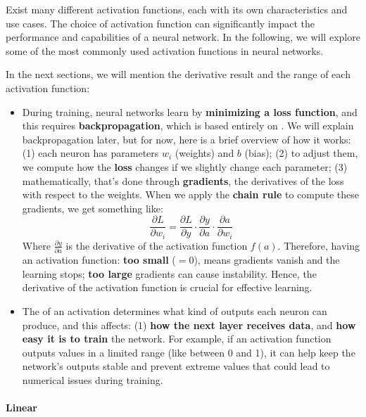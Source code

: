 \highspace
Exist many different activation functions, each with its own characteristics and use cases. The choice of activation function can significantly impact the performance and capabilities of a neural network. In the following, we will explore some of the most commonly used activation functions in neural networks.

\highspace
In the next sections, we will mention the derivative result and the range of each activation function:
\begin{itemize}
    \item During training, neural networks learn by \textbf{minimizing a loss function}, and this requires \textbf{backpropagation}, which is based entirely on . We will explain backpropagation later, but for now, here is a brief overview of how it works: (1) each neuron has parameters $w_i$ (weights) and $b$ (bias); (2) to adjust them, we compute how the \textbf{loss} changes if we slightly change each parameter; (3) mathematically, that's done through \textbf{gradients}, the derivatives of the loss with respect to the weights. When we apply the \textbf{chain rule} to compute these gradients, we get something like:
    \begin{equation*}
        \frac{\partial L}{\partial w_i} = \frac{\partial L}{\partial y} \cdot \frac{\partial y}{\partial a} \cdot \frac{\partial a}{\partial w_i}
    \end{equation*}
    Where $\frac{\partial y}{\partial a}$ is the derivative of the activation function $f(a)$. Therefore, having an activation function: \textbf{too small} ($=0$), means gradients vanish and the learning stops; \textbf{too large} gradients can cause instability. Hence, the derivative of the activation function is crucial for effective learning.

    \item The  of an activation determines what kind of outputs each neuron can produce, and this affects: (1) \textbf{how the next layer receives data}, and \textbf{how easy it is to train} the network. For example, if an activation function outputs values in a limited range (like between 0 and 1), it can help keep the network's outputs stable and prevent extreme values that could lead to numerical issues during training.
\end{itemize}

\newpage

\paragraph{Linear}\label{par:linear-activation-function}

